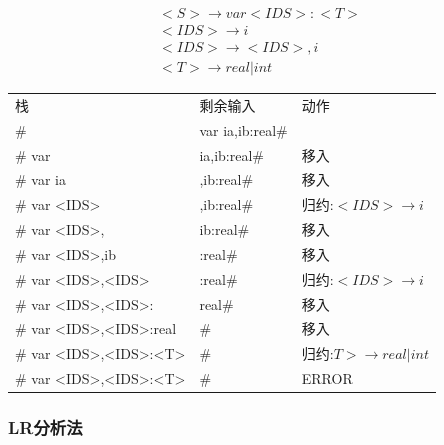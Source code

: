\documentclass[UTF8]{ctexart} %
\begin{document}
\begin{equation}
    \begin{aligned}
        <S>\rightarrow var<IDS>:<T> \\
        <IDS>\rightarrow i          \\
        <IDS>\rightarrow <IDS>,i    \\
        <T>\rightarrow real|int
    \end{aligned}
\end{equation}

\begin{table}[H]
    \centering
    \begin{tabular}{|p{5cm}<{\centering}|p{2.4cm}<{\centering}|p{3.4cm}<{\centering}|}
        \hline
        栈                       & 剩余输入             & 动作                          \\
        \#                      & var ia,ib:real\# &                             \\
        \# var                  & ia,ib:real\#     & 移入                          \\
        \# var ia               & ,ib:real\#       & 移入                          \\
        \# var <IDS>            & ,ib:real\#       & 归约:$<IDS>\rightarrow i$     \\
        \# var <IDS>,           & ib:real\#        & 移入                          \\
        \# var <IDS>,ib         & :real\#          & 移入                          \\
        \# var <IDS>,<IDS>      & :real\#          & 归约:$<IDS>\rightarrow i$     \\
        \# var <IDS>,<IDS>:     & real\#           & 移入                          \\
        \# var <IDS>,<IDS>:real & \#               & 移入                          \\
        \# var <IDS>,<IDS>:<T>  & \#               & 归约:$T>\rightarrow real|int$ \\
        \# var <IDS>,<IDS>:<T>  & \#               & ERROR                       \\
        \hline
    \end{tabular}
\end{table}

\subsubsection{LR分析法}
\end{document}
